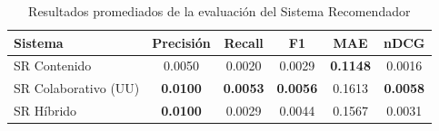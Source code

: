 \documentclass[12pt]{scrartcl}
\begin{document}
\begin{table}[H]
    \centering
    \footnotesize
    \caption{Resultados promediados de la evaluación del Sistema Recomendador}
    \begin{tabularx}{0.85\textwidth}{X c c c c c}
        \toprule
        \textbf{Sistema} & \textbf{Precisión} & \textbf{Recall} & \textbf{F1} & \textbf{MAE} & \textbf{nDCG} \\
        \midrule
        SR Contenido & 0.0050 & 0.0020 & 0.0029 & \textbf{0.1148} & 0.0016 \\
        SR Colaborativo (UU) & \textbf{0.0100} & \textbf{0.0053} & \textbf{0.0056} & 0.1613 & \textbf{0.0058} \\
        SR Híbrido & \textbf{0.0100} & 0.0029 & 0.0044 & 0.1567 & 0.0031 \\
        \bottomrule
    \end{tabularx}
\end{table}
\end{document}
